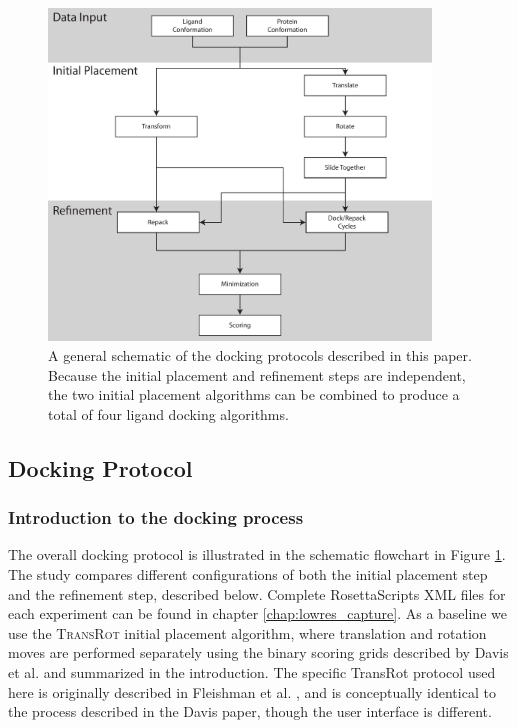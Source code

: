 \begin{figure}
\centering
\includegraphics[width=4in]{figures/lowres/protocol_flowchart.pdf}
\caption{
A general schematic of the docking protocols described in this paper.
Because the initial placement and refinement steps are independent, the two initial placement algorithms can be combined to produce a total of four ligand docking algorithms.  
}
\label{fig:docking_flowchart}
\end{figure}

\subsection{Docking Protocol}
\subsubsection{Introduction to the docking process}
The overall docking protocol is illustrated in the schematic flowchart in Figure \ref{fig:docking_flowchart}.
The study compares different configurations of both the initial placement step and the refinement step, described below.
Complete RosettaScripts \ac{XML} files for each experiment can be found in chapter \ref{chap:lowres_capture}.
As a baseline we use the \textsc{TransRot} initial placement algorithm, where translation and rotation moves are performed separately using the binary scoring grids described by Davis et al. \citep{Davis:2009bf} and summarized in the introduction.
The specific TransRot protocol used here is originally described in Fleishman et al. \citep{Fleishman:2011ji}, and is conceptually identical to the process described in the Davis paper, though the user interface is different. 

